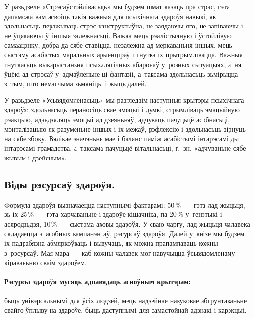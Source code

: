У разьдзеле «Стрэсаўстойлівасьць» мы будзем шмат казаць пра стрэс, гэта дапаможа вам асвоіць такія важныя для псыхічнага здароўя навыкі, як здольнасьць перажываць стрэс канструктыўна, не заядаючы яго, не запіваючы і не ўцякаючы ў~іншыя залежнасьці. Важна мець рэалістычную і ўстойлівую самаацэнку, добра да сябе ставіцца, незалежна ад меркаваньня іншых, мець сыстэму асабістых маральных арыенціраў і гнутка іх прытрымлівацца. Важныя гнуткасьць выкарыстаньня псыхалягічных абаронаў у~розных сытуацыях, а~ня ўцёкі ад стрэсаў у~адмаўленьне ці фантазіі, а~таксама здольнасьць зьмірыцца з~тым, што немагчыма зьмяніць, і жыць далей.

У разьдзеле «Усьвядомленасьць» мы разгледзім наступныя крытэры псыхічнага здароўя: здольнасьць пераносіць свае эмоцыі і думкі, стрымліваць эмацыйную рэакцыю, адзьдзяляць эмоцыі ад дзеяньняў, адчуваць пачуцьцё асобнасьці, мэнталізацыю як разуменьне іншых і іх межаў, рэфлексію і здольнасьць зірнуць на сябе збоку. Вялікае значэньне мае і балянс паміж асабістымі інтарэсамі ды інтарэсамі грамадства, а~таксама пачуцьцё вітальнасьці, г.~зн. «адчуваньне сябе жывым і дзейсным».

\subsection*{Віды рэсурсаў здароўя.}

Формула здароўя вызначаецца наступнымі фактарамі: 50\,\%~--- гэта лад жыцьця, зь іх 25\,\%~--- гэта харчаваньне і здароўе кішачніка, па 20\,\% у~генэтыкі і асяродзьдзя, 10\,\%~--- сыстэма аховы здароўя. У сваю чаргу, лад жыцьця чалавека складаецца з~асобных кампанэнтаў, рэсурсаў здароўя. Далей у~кнізе мы будзем іх падрабязна абмяркоўваць і вывучаць, як можна прапампаваць кожны з~рэсурсаў. Мая мара~--- каб кожны чалавек мог навучыцца ўсьвядомленаму кіраваньню сваім здароўем.


\paragraph{Рэсурсы здароўя мусяць адпавядаць асноўным крытэрам:} быць унівэрсальнымі для ўсіх людзей, мець надзейнае навуковае абгрунтаваньне свайго ўплыву на здароўе, быць даступнымі для самастойнай адзнакі і карэкцыі.


